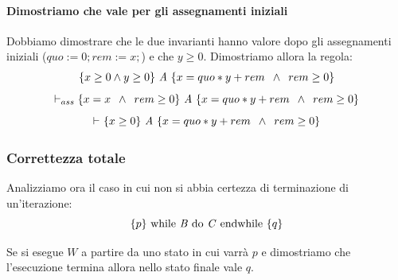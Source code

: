 \begin{esempio}
				      					\paragraph{Dimostriamo che vale per gli assegnamenti iniziali}
				      					Dobbiamo dimostrare che le due invarianti hanno valore dopo gli assegnamenti iniziali ($quo := 0; rem := x;$) e che $y\geq0$. 
				      					Dimostriamo allora la regola:
				      					\begin{align}
				      						\{x\geq 0 \land y\geq 0\}\mbox{ \textit{A} }\{x=quo*y + rem\,\,\,\land\,\,\, rem \geq 0\} 
				      						\label{ToCheck2}                                                                         
				      					\end{align}
				      					\[\vdash_{ass}\{x=x\,\,\,\land\,\,\, rem \geq 0\}\mbox{ \textit{A} }\{x=quo*y + rem\,\,\,\land\,\,\, rem \geq 0\}\]
				      					\[\vdash_{}\{x \geq 0\}\mbox{ \textit{A} }\{x=quo*y + rem\,\,\,\land\,\,\, rem \geq 0\}\]
				      				\end{esempio}
				      				\subsubsection{Correttezza totale}
				      				Analizziamo ora il caso in cui non si abbia certezza di terminazione di
				      				un'iterazione:
				      				\[\{p\}\mbox{ while \textit{B} do \textit{C} endwhile }\{q\}\]
				      								      				\begin{definizione}
				      					Se si esegue $W$  a partire da uno stato in cui varrà $p$ e dimostriamo che l'esecuzione termina allora nello stato finale vale $q$.
				      				\end{definizione} \vspace{5mm} %

